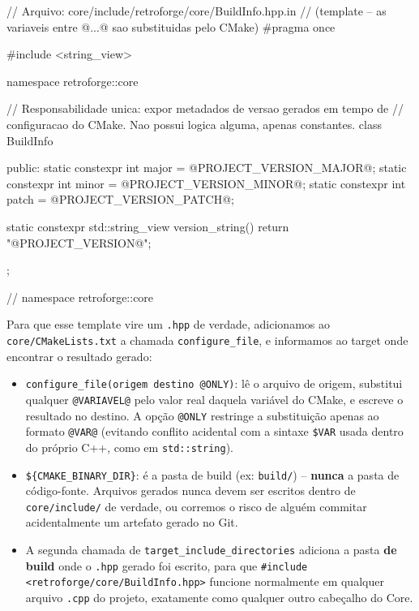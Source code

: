 \begin{CaixaCodigo}
// Arquivo: core/include/retroforge/core/BuildInfo.hpp.in
// (template -- as variaveis entre @...@ sao substituidas pelo CMake)
#pragma once

#include <string_view>

namespace retroforge::core {

// Responsabilidade unica: expor metadados de versao gerados em tempo de
// configuracao do CMake. Nao possui logica alguma, apenas constantes.
class BuildInfo {
public:
    static constexpr int major = @PROJECT_VERSION_MAJOR@;
    static constexpr int minor = @PROJECT_VERSION_MINOR@;
    static constexpr int patch = @PROJECT_VERSION_PATCH@;

    static constexpr std::string_view version_string() {
        return "@PROJECT_VERSION@";
    }
};

} // namespace retroforge::core
\end{CaixaCodigo}

Para que esse template vire um \texttt{.hpp} de verdade, adicionamos ao \texttt{core/CMakeLists.txt} a chamada \texttt{configure\_file}, e informamos ao target onde encontrar o resultado gerado:


\begin{itemize}
    \item \texttt{configure\_file(origem destino @ONLY)}: lê o arquivo de origem, substitui qualquer \texttt{@VARIAVEL@} pelo valor real daquela variável do CMake, e escreve o resultado no destino. A opção \texttt{@ONLY} restringe a substituição apenas ao formato \texttt{@VAR@} (evitando conflito acidental com a sintaxe \texttt{\${VAR}} usada dentro do próprio C++, como em \texttt{std::string}).
    \item \texttt{\$\{CMAKE\_BINARY\_DIR\}}: é a pasta de build (ex: \texttt{build/}) -- \textbf{nunca} a pasta de código-fonte. Arquivos gerados nunca devem ser escritos dentro de \texttt{core/include/} de verdade, ou corremos o risco de alguém commitar acidentalmente um artefato gerado no Git.
    \item A segunda chamada de \texttt{target\_include\_directories} adiciona a pasta \textbf{de build} onde o \texttt{.hpp} gerado foi escrito, para que \texttt{\#include <retroforge/core/BuildInfo.hpp>} funcione normalmente em qualquer arquivo \texttt{.cpp} do projeto, exatamente como qualquer outro cabeçalho do Core.
\end{itemize}

